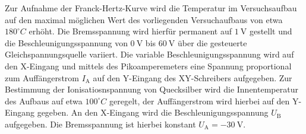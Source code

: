 Zur Aufnahme der Franck-Hertz-Kurve wird die Temperatur im Versuchsaufbau auf den maximal möglichen Wert des vorliegenden Versuchaufbaus von etwa $180^\circ C$ erhöht. Die Bremsspannung wird hierfür permanent auf $\SI{1}{\volt}$ gestellt und die Beschleunigungsspannung von $\SI{0}{\volt}$ bis $\SI{60}{\volt}$ über die gesteuerte Gleichspannungsquelle variiert.
Die variable Beschleunigungsspannung wird auf den X-Eingang und mittels des Pikoamperemeters eine Spannung proportional zum Auffängerstrom $I_\mathrm{A}$ auf den Y-Eingang des XY-Schreibers aufgegeben.
Zur Bestimmung der Ionisatiosnspannung von Quecksilber wird die Innentemperatur des Aufbaus auf etwa $100^\circ C$ geregelt, der Auffängerstrom wird hierbei auf den Y-Eingang gegeben.
An den X-Eingang wird die Beschleunigungsspannung $U_\mathrm{B}$ aufgegeben. Die Bremsspannung ist hierbei konstant $U_\mathrm{A}=\SI{-30}{\volt}$.
